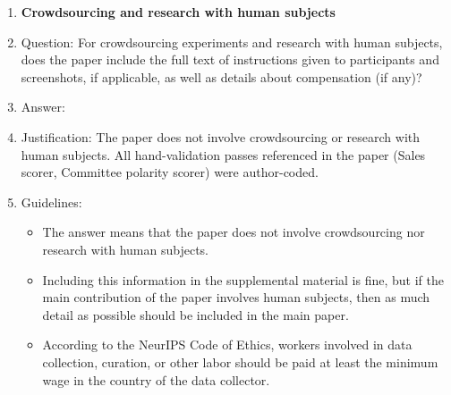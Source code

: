 \documentclass{article}
\begin{document}
\begin{enumerate}
\item {\bf Crowdsourcing and research with human subjects}
    \item[] Question: For crowdsourcing experiments and research with human subjects, does the paper include the full text of instructions given to participants and screenshots, if applicable, as well as details about compensation (if any)? 
    \item[] Answer: \answerNA{} %
    \item[] Justification: The paper does not involve crowdsourcing or research with human subjects. All hand-validation passes referenced in the paper (Sales scorer, Committee polarity scorer) were author-coded.
    \item[] Guidelines:
    \begin{itemize}
        \item The answer \answerNA{} means that the paper does not involve crowdsourcing nor research with human subjects.
        \item Including this information in the supplemental material is fine, but if the main contribution of the paper involves human subjects, then as much detail as possible should be included in the main paper. 
        \item According to the NeurIPS Code of Ethics, workers involved in data collection, curation, or other labor should be paid at least the minimum wage in the country of the data collector. 
    \end{itemize}


\end{enumerate}
\end{document}
